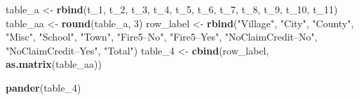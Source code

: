 \documentclass[]{book}
\newenvironment{Shaded}{\begin{snugshade}}{\end{snugshade}}
\newcommand{\KeywordTok}[1]{\textcolor[rgb]{0.13,0.29,0.53}{\textbf{#1}}}
\newcommand{\DecValTok}[1]{\textcolor[rgb]{0.00,0.00,0.81}{#1}}
\newcommand{\StringTok}[1]{\textcolor[rgb]{0.31,0.60,0.02}{#1}}
\newcommand{\NormalTok}[1]{#1}
\theoremstyle{definition}
\theoremstyle{definition}
\theoremstyle{definition}
\theoremstyle{remark}
\begin{document}
\begin{Shaded}
\begin{Highlighting}[]
\NormalTok{table_a <-}\StringTok{ }\KeywordTok{rbind}\NormalTok{(t_}\DecValTok{1}\NormalTok{, t_}\DecValTok{2}\NormalTok{, t_}\DecValTok{3}\NormalTok{, t_}\DecValTok{4}\NormalTok{, t_}\DecValTok{5}\NormalTok{, t_}\DecValTok{6}\NormalTok{, t_}\DecValTok{7}\NormalTok{, t_}\DecValTok{8}\NormalTok{, t_}\DecValTok{9}\NormalTok{, t_}\DecValTok{10}\NormalTok{, t_}\DecValTok{11}\NormalTok{)}
\NormalTok{table_aa <-}\StringTok{ }\KeywordTok{round}\NormalTok{(table_a, }\DecValTok{3}\NormalTok{)}
\NormalTok{row_label <-}\StringTok{ }\KeywordTok{rbind}\NormalTok{(}\StringTok{"Village"}\NormalTok{, }\StringTok{"City"}\NormalTok{, }\StringTok{"County"}\NormalTok{, }\StringTok{"Misc"}\NormalTok{, }\StringTok{"School"}\NormalTok{,}
                  \StringTok{"Town"}\NormalTok{, }\StringTok{"Fire5--No"}\NormalTok{, }\StringTok{"Fire5--Yes"}\NormalTok{, }\StringTok{"NoClaimCredit--No"}\NormalTok{, }
                  \StringTok{"NoClaimCredit--Yes"}\NormalTok{, }\StringTok{"Total"}\NormalTok{)}
\NormalTok{table_}\DecValTok{4}\NormalTok{ <-}\StringTok{ }\KeywordTok{cbind}\NormalTok{(row_label, }\KeywordTok{as.matrix}\NormalTok{(table_aa))}
\end{Highlighting}
\end{Shaded}

\begin{Shaded}
\begin{Highlighting}[]
\KeywordTok{pander}\NormalTok{(table_}\DecValTok{4}\NormalTok{)}
\end{Highlighting}
\end{Shaded}
\end{document}
